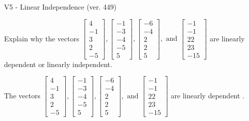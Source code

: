 \begin{exercise}
  \begin{exerciseTitle}V5 - Linear Independence (ver. 449)\end{exerciseTitle}
  \begin{exerciseStatement}
    Explain why the vectors \(\left[\begin{array}{r}
4 \\
-1 \\
3 \\
2 \\
-5
\end{array}\right] , \left[\begin{array}{r}
-1 \\
-3 \\
-4 \\
-5 \\
5
\end{array}\right] , \left[\begin{array}{r}
-6 \\
-4 \\
2 \\
2 \\
5
\end{array}\right] , \text{ and } \left[\begin{array}{r}
-1 \\
-1 \\
22 \\
23 \\
-15
\end{array}\right]\) are linearly dependent or linearly independent.	


  \end{exerciseStatement}
  \begin{exerciseAnswer}
   The vectors \(\left[\begin{array}{r}
4 \\
-1 \\
3 \\
2 \\
-5
\end{array}\right] , \left[\begin{array}{r}
-1 \\
-3 \\
-4 \\
-5 \\
5
\end{array}\right] , \left[\begin{array}{r}
-6 \\
-4 \\
2 \\
2 \\
5
\end{array}\right] , \text{ and } \left[\begin{array}{r}
-1 \\
-1 \\
22 \\
23 \\
-15
\end{array}\right]\) are 
  	 linearly dependent  .
  


  \end{exerciseAnswer}
\end{exercise}
